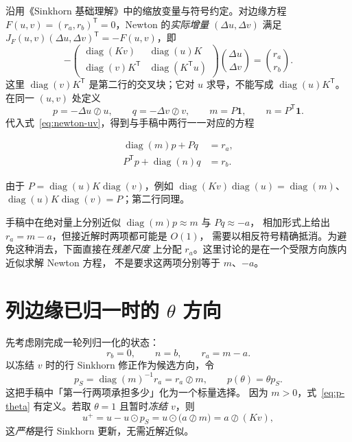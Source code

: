 \documentclass[11pt,a4paper]{ctexart}
\newcommand{\diag}{\operatorname{diag}}
\newcommand{\vone}{\bm{1}}
\newcommand{\trans}{\mathsf{T}}
\begin{document}
沿用《Sinkhorn 基础理解》中的缩放变量与符号约定。对边缘方程
$F(u,v)=(r_a,r_b)^{\trans}=0$，Newton 的\emph{实际增量}
$(\Delta u,\Delta v)$ 满足 $J_F(u,v)(\Delta u,\Delta v)^{\trans}=-F(u,v)$，即
\begin{equation}\label{eq:newton-uv}
 -\begin{pmatrix}
   \diag(Kv)&\diag(u)K\\
   \diag(v)K^{\trans}&\diag(K^{\trans}u)
  \end{pmatrix}
  \binom{\Delta u}{\Delta v}
 =\binom{r_a}{r_b}.
\end{equation}
这里 $\diag(v)K^{\trans}$ 是第二行的交叉块；它对 $u$ 求导，不能写成
$\diag(u)K^{\trans}$。在同一 $(u,v)$ 处定义
\begin{equation}\label{eq:pq}
 p=-\Delta u\oslash u,\qquad q=-\Delta v\oslash v,
 \qquad m=P\vone,\qquad n=P^{\trans}\vone.
\end{equation}
代入式~\eqref{eq:newton-uv}，得到与手稿中两行一一对应的方程
\begin{resultbox}
\begin{equation}\label{eq:block}
 \boxed{\begin{aligned}
   \diag(m)p+Pq&=r_a,\\
   P^{\trans}p+\diag(n)q&=r_b.
 \end{aligned}}
\end{equation}
\end{resultbox}
由于 $P=\diag(u)K\diag(v)$，例如
$\diag(Kv)\diag(u)=\diag(m)$、
$\diag(u)K\diag(v)=P$；第二行同理。

\begin{checknote}
手稿中在绝对量上分别近似 $\diag(m)p\approx m$ 与 $Pq\approx-a$，
相加形式上给出 $r_a=m-a$，但接近解时两项都可能是 $O(1)$，
需要以相反符号精确抵消。为避免这种消去，下面直接在\emph{残差尺度}
上分配 $r_a$。这里讨论的是在一个受限方向族内近似求解 Newton 方程，
不是要求这两项分别等于 $m$、$-a$。
\end{checknote}

\section{列边缘已归一时的 $\theta$ 方向}

先考虑刚完成一轮列归一化的状态：
\begin{equation}\label{eq:column-state}
 r_b=0,\qquad n=b,\qquad r_a=m-a.
\end{equation}
以冻结 $v$ 时的行 Sinkhorn 修正作为候选方向，令
\begin{equation}\label{eq:p-theta}
 p_S=\diag(m)^{-1}r_a=r_a\oslash m,
 \qquad p(\theta)=\theta p_S.
\end{equation}
这把手稿中「第一行两项承担多少」化为一个标量选择。
因为 $m>0$，式~\eqref{eq:p-theta} 有定义。若取 $\theta=1$ 且暂时\emph{冻结 $v$}，则
\begin{equation}\label{eq:row-exact}
 u^+=u- u\odot p_S
 =u\odot\bigl(a\oslash m\bigr)
 =a\oslash(Kv),
\end{equation}
这\emph{严格}是行 Sinkhorn 更新，无需近解近似。
\end{document}
